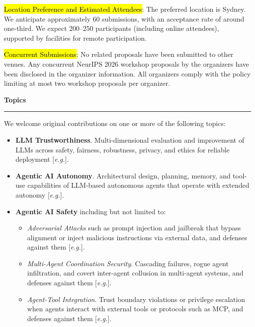 \documentclass{article}
\newcommand{\eg}{\textit{e.g.}}
\newcommand{\sectiontitle}[1]{\noindent\textbf{\textcolor{neuripsblue}{#1}}\vspace{0.1cm}\hrule\vspace{0.2cm}}
\begin{document}
\hl{Location Preference and Estimated Attendees}: The preferred location is Sydney. We anticipate approximately 60 submissions, with an acceptance rate of around one-third. We expect 200–250 participants (including online attendees), supported by facilities for remote participation.

\hl{Concurrent Submissions}: No related proposals have been submitted to other venues.  Any concurrent NeurIPS 2026 workshop proposals by the organizers have been disclosed in the organizer information. All organizers comply with the policy limiting at most two workshop proposals per organizer.

\sectiontitle{Topics}
\vspace{-2pt}
We welcome original contributions on one or more of the following topics:
\begin{itemize}[leftmargin=10pt,itemsep=1pt,topsep=2pt]
\item \textbf{LLM Trustworthiness}. Multi-dimensional evaluation and improvement of LLMs across safety, fairness, robustness, privacy, and ethics for reliable deployment [\eg \cite{wang2023decodingtrust, huang2024trustllm, wei2023jailbroken}].

\item \textbf{Agentic AI Autonomy}. Architectural design, planning, memory, and tool-use capabilities of LLM-based autonomous agents that operate with extended autonomy [\eg \cite{yao2023react, zhou2024webarena, yang2024sweagent}].

\item \textbf{Agentic AI Safety} including but not limited to:
\begin{itemize}[itemsep=1pt,topsep=0pt]
\item \textit{Adversarial Attacks} such as prompt injection and jailbreak that bypass alignment or inject malicious instructions via external data, and defenses against them [\eg \cite{zou2023universal, liu2024autodan, chen2025struq}].

\item \textit{Multi-Agent Coordination Security}.  Cascading failures, rogue agent infiltration, and covert inter-agent collusion in multi-agent systems, and defenses against them [\eg \cite{gu2024agentsmith}].

\item \textit{Agent-Tool Integration}. Trust boundary violations  or privilege escalation when agents interact with external tools or protocols such as MCP, and defenses against them [\eg \cite{wu2025isolategpt}].


\end{itemize}
\end{itemize}
\end{document}

